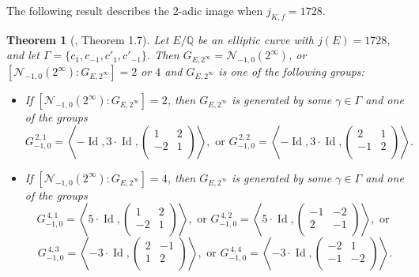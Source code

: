 \documentclass[11pt]{amsart}
\newtheorem{thm}[defn]{Theorem}
\theoremstyle{definition}
\newcommand{\Q}{\mathbb Q}
\begin{document}
The following result describes the $2$-adic image when $j_{K,f}=1728$.

\begin{thm}[\cite{lozano-galoiscm}, Theorem 1.7]\label{thm-j1728alvaro}\label{thm-lastofsec1}
	Let $E/\Q$ be an elliptic curve with $j(E)=1728$, and let $\Gamma = \{ c_{1}, c_{-1}, c'_{1}, c'_{-1} \}$. Then $G_{E,2^\infty} = \mathcal{N}_{-1,0}(2^\infty)$, or $[\mathcal{N}_{-1,0}(2^\infty) : G_{E,2^\infty}] = 2$ or $4$ and $G_{E,2^\infty}$ is one of the following groups:
	\begin{itemize} 
		\item If $[\mathcal{N}_{-1,0}(2^\infty):G_{E,2^\infty}]=2$, then $G_{E,2^\infty}$ is generated by some $\gamma\in \Gamma$ and one of the groups
		\[ G^{\, 2,1}_{-1, 0}=\left\langle -\operatorname{Id}, 3\cdot \operatorname{Id},\left(\begin{array}{cc} 1 & 2\\ -2 & 1\\\end{array}\right) \right\rangle, \text{ or } G^{\, 2,2}_{-1, 0}=\left\langle -\operatorname{Id}, 3\cdot \operatorname{Id},\left(\begin{array}{cc} 2 & 1\\ -1 & 2\\\end{array}\right) \right\rangle. \]
		\item If $[\mathcal{N}_{-1,0}(2^\infty) : G_{E,2^\infty}]=4$, then $G_{E,2^\infty}$ is generated by some $\gamma \in \Gamma$ and one of the groups
		\[ G^{\, 4,1}_{-1, 0}=\left\langle 5\cdot \operatorname{Id},\left(\begin{array}{cc} 1 & 2\\ -2 & 1\\\end{array}\right) \right\rangle, \text{ or } G^{\, 4,2}_{-1, 0}=\left\langle 5\cdot \operatorname{Id},\left(\begin{array}{cc} -1 & -2\\ 2 & -1\\\end{array}\right) \right\rangle, \text{ or } \]
		\[ G^{\, 4,3}_{-1, 0}= \left\langle -3\cdot \operatorname{Id},\left(\begin{array}{cc} 2 & -1\\ 1 & 2\\\end{array}\right) \right\rangle, \text{ or } G^{\, 4,4}_{-1, 0}=\left\langle -3\cdot \operatorname{Id},\left(\begin{array}{cc} -2 & 1\\ -1 & -2\\\end{array}\right) \right\rangle. \]
\end{itemize}
\end{thm}
\end{document}
